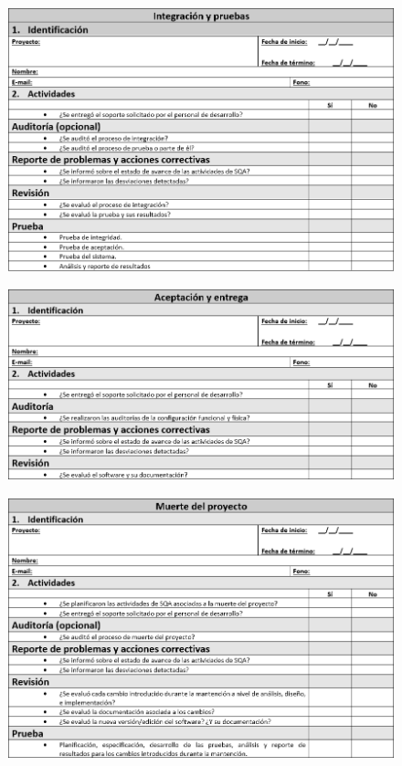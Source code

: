 \begin{figure}[H]
\centering
\includegraphics[width=1\textwidth]{figures/anexos/3-1-4.PNG}
\end{figure}

\begin{figure}[H]
\centering
\includegraphics[width=1\textwidth]{figures/anexos/3-1-5.PNG}
\end{figure}

\begin{figure}[H]
\centering
\includegraphics[width=1\textwidth]{figures/anexos/3-1-6.PNG}
\end{figure}

